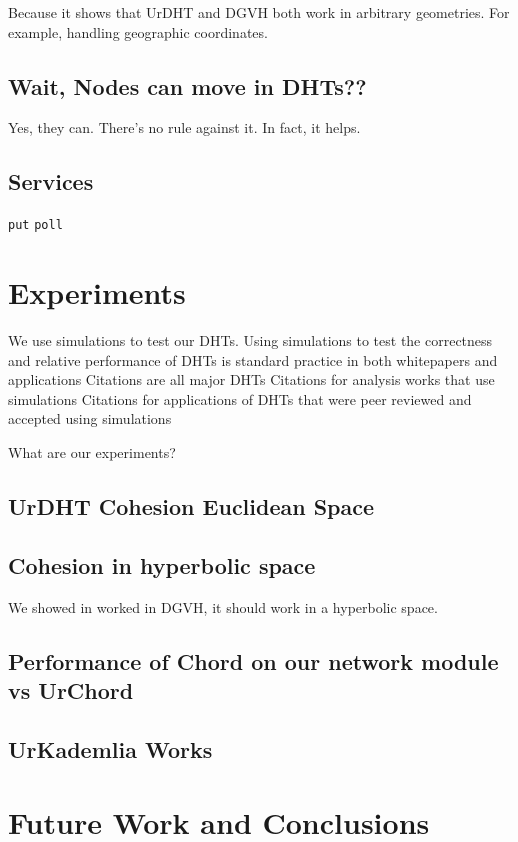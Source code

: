 \documentclass[11pt,conference]{IEEEtran}
\begin{document}
	Because it shows that UrDHT and DGVH both work in arbitrary geometries.
	For example, handling geographic coordinates. 
	
	
	\subsection{Wait, Nodes can move in DHTs??}
	Yes, they can.  
	There's no rule against it. 
	In fact, it helps.
	
	\subsection{Services}
	\texttt{put}  \texttt{poll}
	
\section{Experiments}
\label{sec:experiments}

We use simulations to test our DHTs.
Using simulations to test the correctness and relative performance of DHTs is standard practice in both whitepapers and applications
Citations are all major DHTs
Citations for analysis works that use simulations
Citations for applications of DHTs that were peer reviewed and accepted using simulations

What are our experiments?

\subsection{UrDHT Cohesion Euclidean Space}



\subsection{Cohesion in hyperbolic space}
We showed in worked in DGVH, it should work in a hyperbolic space.


\subsection{Performance of Chord on our network module vs UrChord}


\subsection{UrKademlia Works}


\section{Future Work and Conclusions}
\label{sec:future}
\end{document}
